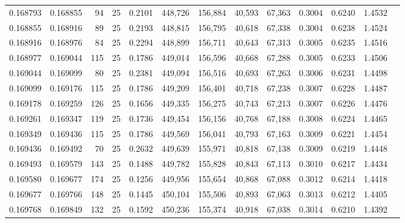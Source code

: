 \begin{tabular}{rrrrrrrrrrrrr}
0.168793 & 0.168855 &    94 &  25 &                                     0.2101 & 448,726 & 156,884 &  40,593 &  67,363 & 0.3004 & 0.6240 & 1.4532 \\
0.168855 & 0.168916 &    89 &  25 &                                     0.2193 & 448,815 & 156,795 &  40,618 &  67,338 & 0.3004 & 0.6238 & 1.4524 \\
0.168916 & 0.168976 &    84 &  25 &                                     0.2294 & 448,899 & 156,711 &  40,643 &  67,313 & 0.3005 & 0.6235 & 1.4516 \\
0.168977 & 0.169044 &   115 &  25 &                                     0.1786 & 449,014 & 156,596 &  40,668 &  67,288 & 0.3005 & 0.6233 & 1.4506 \\
0.169044 & 0.169099 &    80 &  25 &                                     0.2381 & 449,094 & 156,516 &  40,693 &  67,263 & 0.3006 & 0.6231 & 1.4498 \\
0.169099 & 0.169176 &   115 &  25 &                                     0.1786 & 449,209 & 156,401 &  40,718 &  67,238 & 0.3007 & 0.6228 & 1.4487 \\
0.169178 & 0.169259 &   126 &  25 &                                     0.1656 & 449,335 & 156,275 &  40,743 &  67,213 & 0.3007 & 0.6226 & 1.4476 \\
0.169261 & 0.169347 &   119 &  25 &                                     0.1736 & 449,454 & 156,156 &  40,768 &  67,188 & 0.3008 & 0.6224 & 1.4465 \\
0.169349 & 0.169436 &   115 &  25 &                                     0.1786 & 449,569 & 156,041 &  40,793 &  67,163 & 0.3009 & 0.6221 & 1.4454 \\
0.169436 & 0.169492 &    70 &  25 &                                     0.2632 & 449,639 & 155,971 &  40,818 &  67,138 & 0.3009 & 0.6219 & 1.4448 \\
0.169493 & 0.169579 &   143 &  25 &                                     0.1488 & 449,782 & 155,828 &  40,843 &  67,113 & 0.3010 & 0.6217 & 1.4434 \\
0.169580 & 0.169677 &   174 &  25 &                                     0.1256 & 449,956 & 155,654 &  40,868 &  67,088 & 0.3012 & 0.6214 & 1.4418 \\
0.169677 & 0.169766 &   148 &  25 &                                     0.1445 & 450,104 & 155,506 &  40,893 &  67,063 & 0.3013 & 0.6212 & 1.4405 \\
0.169768 & 0.169849 &   132 &  25 &                                     0.1592 & 450,236 & 155,374 &  40,918 &  67,038 & 0.3014 & 0.6210 & 1.4392 \\

\end{tabular}
